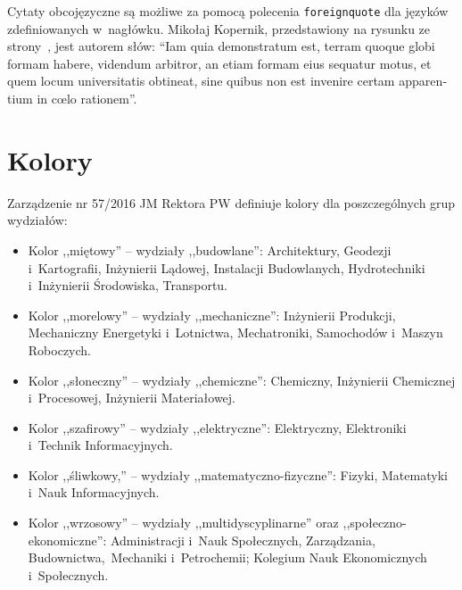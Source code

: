 Cytaty obcojęzyczne są możliwe za pomocą polecenia \texttt{foreignquote} dla języków zdefiniowanych w~nagłówku. Mikołaj Kopernik, przedstawiony na rysunku ze strony~\pageref{rys:kopernik}, jest autorem słów: \foreignquote{latin}{Iam quia demonstratum est, terram quoque globi formam habere, videndum arbitror, an etiam formam eius sequatur motus, et quem locum universitatis obtineat, sine quibus non est invenire certam apparentium in cœlo rationem}.

\section{Kolory}
Zarządzenie nr 57/2016 JM Rektora PW definiuje kolory dla poszczególnych grup wydziałów:
\begin{itemize}
    \item Kolor ,,miętowy'' -- \colorbox{bud}{wydziały ,,budowlane'':}{\color{bud} Architektury, Geodezji i~Kartografii, Inżynierii Lądowej, Instalacji Budowlanych, Hydrotechniki i~Inżynierii Środowiska, Transportu.}
    \item Kolor ,,morelowy'' -- \colorbox{mech}{wydziały ,,mechaniczne'':}{\color{mech} Inżynierii Produkcji, Mechaniczny Energetyki i~Lotnictwa, Mechatroniki, Samochodów i~Maszyn Roboczych.}
    \item Kolor ,,słoneczny'' -- \colorbox{chem}{wydziały ,,chemiczne'':}{\color{chem} Chemiczny, Inżynierii Chemicznej i~Procesowej, Inżynierii Materiałowej.}
    \item Kolor ,,szafirowy'' -- \colorbox{elek}{wydziały ,,elektryczne'':}{\color{elek} Elektryczny, Elektroniki i~Technik Informacyjnych.}
    \item Kolor ,,śliwkowy,'' -- \colorbox{mfiz}{wydziały ,,matematyczno-fizyczne'':}{\color{mfiz} Fizyki, Matematyki i~Nauk Informacyjnych.}
    \item Kolor ,,wrzosowy'' -- \colorbox{multi}{wydziały ,,multidyscyplinarne'' oraz ,,społeczno-ekonomiczne'':}{\color{multi} Administracji i~Nauk Społecznych, Zarządzania, Budownictwa,~Mechaniki i~Petrochemii; Kolegium Nauk Ekonomicznych i~Społecznych.}
\end{itemize}


